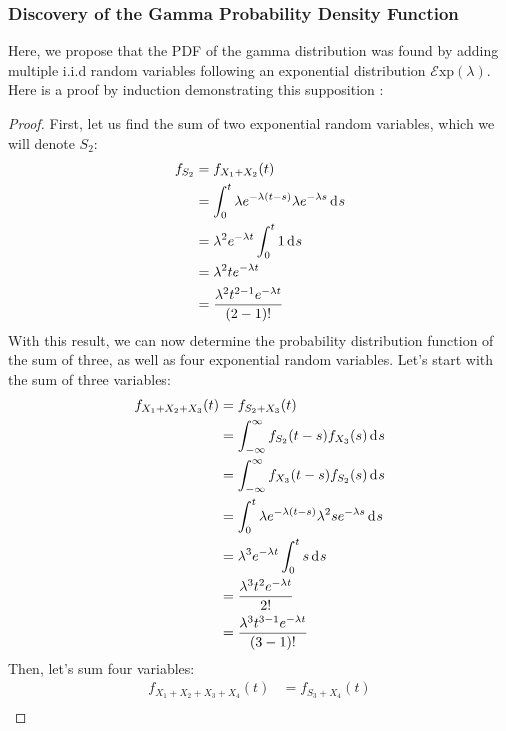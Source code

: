\documentclass[12pt]{article}
\newcommand{\E}{\mathcal{E}}
\begin{document}
\subsubsection{Discovery of the Gamma Probability Density Function}
Here, we propose that the PDF of the gamma distribution was found by adding multiple i.i.d random variables following an
exponential distribution $\E\text{xp}(\lambda)$. Here is a proof by induction demonstrating this supposition
\cite{ayiendaGammaRelatedDistributions2013}:
\begin{proof}
	First, let us find the sum of two exponential random variables, which we will denote $S_2$:
	\begin{equation}
		\begin{split}
			f_{S_2}	&=	f_{X_1 + X_2} (t)\\
					&=	\int^t_0 \lambda e^{-\lambda(t-s)}\lambda e^{-\lambda s}\mathop{}\!\mathrm{d^{}}s\\
					&=	\lambda^2 e^{-\lambda t}\int^t_0 1\mathop{}\!\mathrm{d^{}}s\\
					&=	\lambda^2 te^{-\lambda t}\\
					&=	\frac{\lambda^2 t^{2-1} e^{-\lambda t}}{(2-1)!}
		\end{split}
	\end{equation}
	With this result, we can now determine the probability distribution function of the sum of three, as well as four
	exponential random variables. Let's start with the sum of three variables:
	\begin{equation}
		\begin{split}
			f_{X_1 + X_2 + X_3}(t)	&=	f_{S_2 + X_3}(t)\\
			 						&=	\int^\infty_{-\infty} f_{S_2}(t-s)f_{X_3}(s)\mathop{}\!\mathrm{d^{}}s\\
			 						&=	\int^\infty_{-\infty} f_{X_3}(t-s)f_{S_2}(s)\mathop{}\!\mathrm{d^{}}s\\
			 						&=	\int^t_0 \lambda e^{-\lambda(t-s)}\lambda^2 s e^{-\lambda s}\mathop{}\!\mathrm{d^{}}s\\
									&=	\lambda^3 e^{-\lambda t} \int^t_0 s\mathop{}\!\mathrm{d^{}}s\\
									&=	\frac{\lambda^3 t^2 e^{-\lambda t}}{2!}\\
									&=	\frac{\lambda^3 t^{3-1} e^{-\lambda t}}{(3-1)!}
		\end{split}
	\end{equation}
	Then, let's sum four variables:
	\begin{equation}
		\begin{split}
			f_{X_1+X_2+X_3+X_4}(t)	&=	f_{S_3+X_4}(t)\\

\end{split}
\end{equation}
\end{proof}
\end{document}
